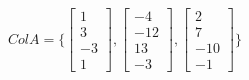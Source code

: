 \documentclass{report}
\begin{document}
\begin{center}
    $Col A = 
    \{
        \begin{bmatrix}
            1 \\
            3 \\
            -3 \\
            1
        \end{bmatrix}
        ,
        \begin{bmatrix}
            -4 \\
            -12 \\
            13 \\
            -3
        \end{bmatrix}
        ,
        \begin{bmatrix}
            2 \\
            7 \\
            -10 \\
            -1
        \end{bmatrix}
    \}
    $
\end{center}
\end{document}
